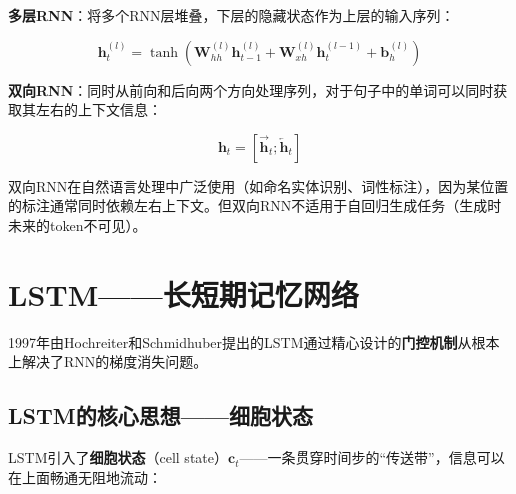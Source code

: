 \textbf{多层RNN}：将多个RNN层堆叠，下层的隐藏状态作为上层的输入序列：

\[
\mathbf{h}_t^{(l)} = \tanh(\mathbf{W}_{hh}^{(l)}\mathbf{h}_{t-1}^{(l)} + \mathbf{W}_{xh}^{(l)}\mathbf{h}_t^{(l-1)} + \mathbf{b}_h^{(l)})
\]

\textbf{双向RNN}：同时从前向和后向两个方向处理序列，对于句子中的单词可以同时获取其左右的上下文信息：

\[
\mathbf{h}_t = \left[\overrightarrow{\mathbf{h}}_t; \overleftarrow{\mathbf{h}}_t\right]
\]

双向RNN在自然语言处理中广泛使用（如命名实体识别、词性标注），因为某位置的标注通常同时依赖左右上下文。但双向RNN不适用于自回归生成任务（生成时未来的token不可见）。

\section{LSTM——长短期记忆网络}

1997年由Hochreiter和Schmidhuber提出的LSTM通过精心设计的\textbf{门控机制}从根本上解决了RNN的梯度消失问题。

\subsection{LSTM的核心思想——细胞状态}

LSTM引入了\textbf{细胞状态}（cell state）$\mathbf{c}_t$——一条贯穿时间步的``传送带''，信息可以在上面畅通无阻地流动：

